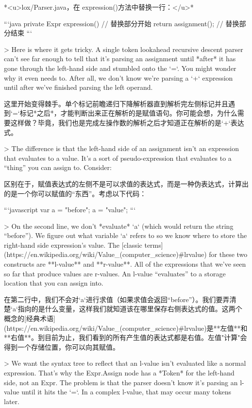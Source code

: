 \documentclass[cn,11pt,chinese]{elegantbook}
\begin{document}
{{{{{{{*<u>lox/Parser.java，在 expression()方法中替换一行：</u>*

```java
  private Expr expression() {
    // 替换部分开始
    return assignment();
    // 替换部分结束
  }
```

> Here is where it gets tricky. A single token lookahead recursive descent parser can’t see far enough to tell that it’s parsing an assignment until *after* it has gone through the left-hand side and stumbled onto the `=`. You might wonder why it even needs to. After all, we don’t know we’re parsing a `+` expression until after we’ve finished parsing the left operand.

这里开始变得棘手。单个标记前瞻递归下降解析器直到解析完左侧标记并且遇到`=`标记*之后*，才能判断出来正在解析的是赋值语句。你可能会想，为什么需要这样做？毕竟，我们也是完成左操作数的解析之后才知道正在解析的是`+`表达式。

> The difference is that the left-hand side of an assignment isn’t an expression that evaluates to a value. It’s a sort of pseudo-expression that evaluates to a “thing” you can assign to. Consider:

区别在于，赋值表达式的左侧不是可以求值的表达式，而是一种伪表达式，计算出的是一个你可以赋值的“东西”。考虑以下代码：

```javascript
var a = "before";
a = "value";
```

> On the second line, we don’t *evaluate* `a` (which would return the string “before”). We figure out what variable `a` refers to so we know where to store the right-hand side expression’s value. The [classic terms](https://en.wikipedia.org/wiki/Value_(computer_science)#lrvalue) for these two constructs are **l-value** and **r-value**. All of the expressions that we’ve seen so far that produce values are r-values. An l-value “evaluates” to a storage location that you can assign into.

在第二行中，我们不会对`a`进行求值（如果求值会返回“before”）。我们要弄清楚`a`指向的是什么变量，这样我们就知道该在哪里保存右侧表达式的值。这两个概念的[经典术语](https://en.wikipedia.org/wiki/Value_(computer_science)#lrvalue)是**左值**和**右值**。到目前为止，我们看到的所有产生值的表达式都是右值。左值"计算"会得到一个存储位置，你可以向其赋值。

> We want the syntax tree to reflect that an l-value isn’t evaluated like a normal expression. That’s why the Expr.Assign node has a *Token* for the left-hand side, not an Expr. The problem is that the parser doesn’t know it’s parsing an l-value until it hits the `=`. In a complex l-value, that may occur many tokens later.

}}}}}}}
\end{document}
